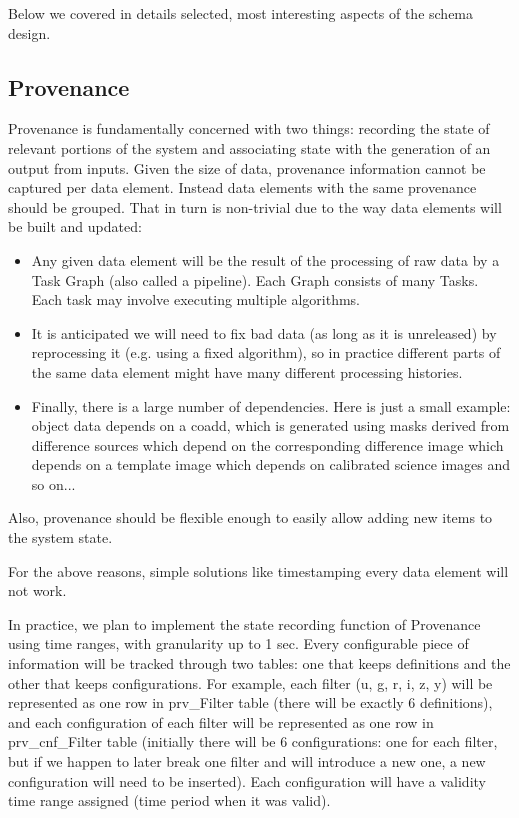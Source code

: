 \documentclass[DM,lsstdraft,toc]{lsstdoc}
\begin{document}
Below we covered in details selected, most interesting aspects of the schema design.

\subsection{Provenance}

Provenance is fundamentally concerned with two things: recording the state of relevant portions of the system and associating state with the generation of an output from inputs. Given the size of data, provenance information cannot be captured per data element. Instead data elements with the same provenance should be grouped. That in turn is non-trivial due to the way data elements will be built and updated:

\begin{itemize}
  \item Any given data element will be the result of the processing of raw data by a Task Graph (also called a pipeline). Each Graph consists of many Tasks. Each task may involve executing multiple algorithms.
  \item It is anticipated we will need to fix bad data (as long as it is unreleased) by reprocessing it (e.g. using a fixed algorithm), so in practice different parts of the same data element might have many different processing histories.
  \item Finally, there is a large number of dependencies. Here is just a small example: object data depends on a coadd, which is generated using masks derived from difference sources which depend on the corresponding difference image which depends on a template image which depends on calibrated science images and so on...
\end{itemize}

Also, provenance should be flexible enough to easily allow adding new items to the system state.

For the above reasons, simple solutions like timestamping every data element will not work.

In practice, we plan to implement the state recording function of Provenance using time ranges, with granularity up to 1 sec. Every configurable piece of information will be tracked through two tables: one that keeps definitions and the other that keeps configurations. For example, each filter (u, g, r, i, z, y) will be represented as one row in prv\_Filter table (there will be exactly 6 definitions), and each configuration of each filter will be represented as one row in prv\_cnf\_Filter table (initially there will be 6 configurations: one for each filter, but if we happen to later break one filter and will introduce a new one, a new configuration will need to be inserted). Each configuration will have a validity time range assigned (time period when it was valid).
\end{document}
